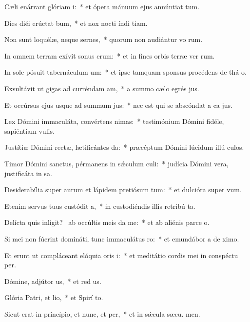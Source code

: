 \item Cæli enárrant glóriam i:~* et ópera mánuum ejus annúntiat tum.
\item Dies diéi erúctat bum,~* et nox nocti índi tiam.
\item Non sunt loquélæ, neque sernes,~* quorum non audiántur vo rum.
\item In omnem terram exívit sonus erum:~* et in fines orbis terræ ver rum.
\item In sole pósuit tabernáculum um:~* et ipse tamquam sponsus procédens de thá o.
\item Exsultávit ut gigas ad curréndam am,~* a summo cælo egrés jus.
\item Et occúrsus ejus usque ad summum jus:~* nec est qui se abscóndat a ca jus.
\item Lex Dómini immaculáta, convértens nimas:~* testimónium Dómini fidéle, sapiéntiam  vulis.
\item Justítiæ Dómini rectæ, lætificántes da:~* præcéptum Dómini lúcidum illú culos.
\item Timor Dómini sanctus, pérmanens in sǽculum culi:~* judícia Dómini vera, justificáta in sa.
\item Desiderabília super aurum et lápidem pretiósum tum:~* et dulcióra super   vum.
\item Etenim servus tuus custódit a,~* in custodiéndis illis retribú ta.
\item Delícta quis inligit?~\pscross{} ab occúltis meis da me:~* et ab aliénis parce  o.
\item Si mei non fúerint domináti, tunc immaculátus ro:~* et emundábor a de ximo.
\item Et erunt ut compláceant elóquia oris i:~* et meditátio cordis mei in conspéctu  per.
\item Dómine, adjútor us,~* et red us.
\item Glória Patri, et lio,~* et Spirí to.
\item Sicut erat in princípio, et nunc, et per,~* et in sǽcula sæcu. men.
